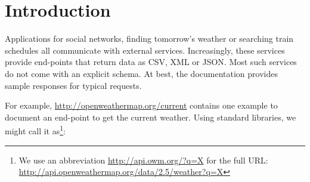 \documentclass[10pt]{sigplanconf}
\begin{document}
%
%

\section{Introduction}
\label{sec:introduction}

Applications for social networks, finding tomorrow's weather or searching train schedules
all communicate with external services. Increasingly, these services provide end-points that return 
data as CSV, XML or JSON. Most such services do not come with an explicit schema. At best, the 
documentation provides sample responses for typical requests.

For example, \url{http://openweathermap.org/current} contains one example to document an end-point 
to get the current weather. Using standard libraries, we might call it as\footnote{We use an abbreviation
\url{http://api.owm.org/?q=X} for the full URL:
\url{http://api.openweathermap.org/data/2.5/weather?q=X} 
}:
\end{document}
